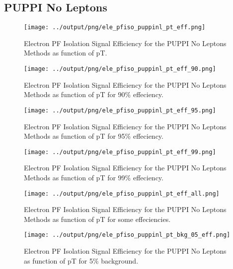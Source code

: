 \documentclass[11pt]{book}
\begin{document}
\subsection{PUPPI No Leptons}
\begin{figure}[htb]
\centering
\texttt{[image: ../output/png/ele\_pfiso\_puppinl\_pt\_eff.png]}
\caption{Electron PF Isolation Signal Efficiency for the PUPPI No Leptons Methods as function of pT.}
\label{fig:ele_pfiso_pt_eff_puppinl}
\end{figure}

\begin{figure}[htb]
\centering
\texttt{[image: ../output/png/ele\_pfiso\_puppinl\_pt\_eff\_90.png]}
\caption{Electron PF Isolation Signal Efficiency for the PUPPI No Leptons Methods as function of pT for 90\% effeciency.}
\label{fig:ele_pfiso_pt_eff_puppinl_eff_90}
\end{figure}

\begin{figure}[htb]
\centering
\texttt{[image: ../output/png/ele\_pfiso\_puppinl\_pt\_eff\_95.png]}
\caption{Electron PF Isolation Signal Efficiency for the PUPPI No Leptons Methods as function of pT for 95\% effeciency.}
\label{fig:ele_pfiso_pt_eff_puppinl_eff_95}
\end{figure}

\begin{figure}[htb]
\centering
\texttt{[image: ../output/png/ele\_pfiso\_puppinl\_pt\_eff\_99.png]}
\caption{Electron PF Isolation Signal Efficiency for the PUPPI No Leptons Methods as function of pT for 99\% effeciency.}
\label{fig:ele_pfiso_pt_eff_puppinl_eff_99}
\end{figure}

\begin{figure}[htb]
\centering
\texttt{[image: ../output/png/ele\_pfiso\_puppinl\_pt\_eff\_all.png]}
\caption{Electron PF Isolation Signal Efficiency for the PUPPI No Leptons Methods as function of pT for some effeciencies.}
\label{fig:ele_pfiso_pt_eff_puppinl_eff_all}
\end{figure}

\begin{figure}[htb]
\centering
\texttt{[image: ../output/png/ele\_pfiso\_puppinl\_pt\_bkg\_05\_eff.png]}
\caption{Electron PF Isolation Signal Efficiency for the PUPPI No Leptons as function of pT for 5\% background.}
\label{fig:ele_pfiso_pt_bkg_puppinl_bkg_05_eff}
\end{figure}
\end{document}
